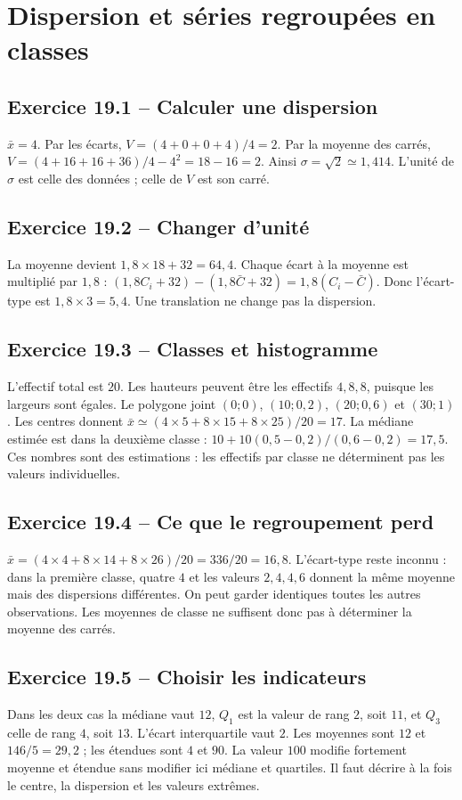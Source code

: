 \chapter{Dispersion et séries regroupées en classes}
\section*{Exercice 19.1 -- Calculer une dispersion}
$\bar x=4$. Par les écarts, $V=(4+0+0+4)/4=2$. Par la moyenne des carrés, $V=(4+16+16+36)/4-4^2=18-16=2$. Ainsi $\sigma=\sqrt2\simeq1{,}414$. L'unité de $\sigma$ est celle des données ; celle de $V$ est son carré.

\section*{Exercice 19.2 -- Changer d'unité}
La moyenne devient $1{,}8\times18+32=64{,}4$. Chaque écart à la moyenne est multiplié par $1{,}8$ : $(1{,}8C_i+32)-(1{,}8\bar C+32)=1{,}8(C_i-\bar C)$. Donc l'écart-type est $1{,}8\times3=5{,}4$. Une translation ne change pas la dispersion.

\section*{Exercice 19.3 -- Classes et histogramme}
L'effectif total est $20$. Les hauteurs peuvent être les effectifs $4,8,8$, puisque les largeurs sont égales. Le polygone joint $(0;0)$, $(10;0{,}2)$, $(20;0{,}6)$ et $(30;1)$. Les centres donnent $\bar x\simeq(4\times5+8\times15+8\times25)/20=17$. La médiane estimée est dans la deuxième classe : $10+10(0{,}5-0{,}2)/(0{,}6-0{,}2)=17{,}5$. Ces nombres sont des estimations : les effectifs par classe ne déterminent pas les valeurs individuelles.

\section*{Exercice 19.4 -- Ce que le regroupement perd}
$\bar x=(4\times4+8\times14+8\times26)/20=336/20=16{,}8$. L'écart-type reste inconnu : dans la première classe, quatre $4$ et les valeurs $2,4,4,6$ donnent la même moyenne mais des dispersions différentes. On peut garder identiques toutes les autres observations. Les moyennes de classe ne suffisent donc pas à déterminer la moyenne des carrés.

\section*{Exercice 19.5 -- Choisir les indicateurs}
Dans les deux cas la médiane vaut $12$, $Q_1$ est la valeur de rang $2$, soit $11$, et $Q_3$ celle de rang $4$, soit $13$. L'écart interquartile vaut $2$. Les moyennes sont $12$ et $146/5=29{,}2$ ; les étendues sont $4$ et $90$. La valeur $100$ modifie fortement moyenne et étendue sans modifier ici médiane et quartiles. Il faut décrire à la fois le centre, la dispersion et les valeurs extrêmes.

